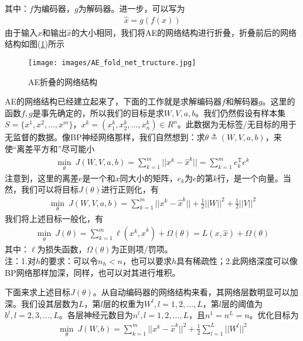         其中：$f$为编码器，$g$为解码器。进一步，可以写为
        \begin{align*}
        \hat{x} = g(f(x))
        \end{align*}
        由于输入$x$和输出$\hat{x}$的大小相同，我们将AE的网络结构进行折叠，折叠前后的网络结构如图(\ref{fig:AE折叠的网络结构})所示
            \begin{figure}[H]
            \centering
            \texttt{[image: images/AE\_fold\_net\_tructure.jpg]}
            \caption{AE折叠的网络结构}
            \label{fig:AE折叠的网络结构}
            \end{figure}
        \par
        AE的网络结构已经建立起来了，下面的工作就是求解编码器$f$和解码器$g$。这里的函数$f,g$是事先确定的，所以我们的目标是求$W,V,a,b$。我们仍然假设有样本集$S = \{x^{1},x^{2},\dots,x^{m}\}$，$x^{k} = (x_1^k,x_2^k,\dots,x_n^k)\in R^n$。此数据为无标签/无目标的用于无监督的数据。像BP神经网络那样，我们自然想到：求$\theta\triangleq (W,V,a,b)$，来使“离差平方和”尽可能小
        \begin{align*}
        \min_\theta \ J(W,V,a,b) = \sum_{k=1}^m||x^k -\hat{x}^k|| = \sum_{k=1}^m e_k^\mathrm{T}e^k
        \end{align*}
        注意到，这里的离差$e$是一个和$x$同大小的矩阵，$e_k$为$e$的第$k$行，是一个向量。当然，我们可以将目标$J(\theta)$进行正则化，有
        \begin{align*}
        \min_\theta \ J(W,V,a,b) = \sum_{k=1}^m ||x^k - \hat{x}^k|| + \frac{1}{2} ||W||^2 + \frac{1}{2}||V||^2
        \end{align*}
        我们将上述目标一般化，有
        \begin{align*}
        \min_\theta \ J(\theta)= \sum_{k=1}^m \ell(x^k,\hat{x}^k) + \Omega (\theta) = L(x,\hat{x}) + \Omega(\theta)
        \end{align*}
        其中：$\ell$为损失函数，$\Omega(\theta)$为正则项/罚项。\\
        注：1.对$h$的要求：可以令$n_h < n$，也可以要求$h$具有稀疏性；2.此网络深度可以像BP网络那样加深，同样，也可以对其进行堆积。
        \par
        下面来求上述目标$J(\theta)$。从自动编码器的网络结构来看，其网络层数明显可以加深。我们设其层数为$L$，第$l$层的权重为$W^{l},l=1,2,\dots,L$，第$l$层的阈值为$b^{l},l=2,3,\dots,L$。各层神经元数目为$n^{l},l=1,2,\dots,L$，且$n^{1} = n^{L} = n$。优化目标为
        \begin{align*}
        \min_\theta\ J(W,b) = \sum_{k=1}^m ||x^k - \hat{x}^k||^2 + \frac{1}{2}\sum_{l=1}^L||W^l||^2
        \end{align*}
